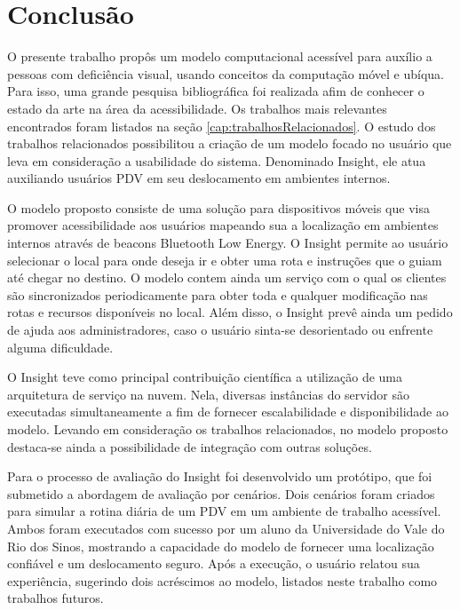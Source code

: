 \documentclass[twoside,english,brazilian]{UNISINOSartigo}
\begin{document}
\section{Conclusão}
O presente trabalho propôs um modelo computacional acessível para auxílio a pessoas com deficiência visual, usando conceitos da computação móvel e ubíqua. Para isso, uma grande pesquisa bibliográfica foi realizada afim de conhecer o estado da arte na área da acessibilidade. Os trabalhos mais relevantes encontrados foram listados na seção \ref{cap:trabalhosRelacionados}. O estudo dos trabalhos relacionados possibilitou a criação de um modelo focado no usuário que leva em consideração a usabilidade do sistema. Denominado Insight, ele atua auxiliando usuários PDV em seu deslocamento em ambientes internos. 

O modelo proposto consiste de uma solução para dispositivos móveis que visa promover acessibilidade aos usuários mapeando sua a localização em ambientes internos através de beacons Bluetooth Low Energy. O Insight permite ao usuário selecionar o local para onde deseja ir e obter uma rota e instruções que o guiam até chegar no destino. O modelo contem ainda um serviço com o qual os clientes são sincronizados periodicamente para obter toda e qualquer modificação nas rotas e recursos disponíveis no local. Além disso, o Insight prevê ainda um pedido de ajuda aos administradores, caso o usuário sinta-se desorientado ou enfrente alguma dificuldade.

O Insight teve como principal contribuição científica a utilização de uma arquitetura de serviço na nuvem. Nela, diversas instâncias do servidor são executadas simultaneamente a fim de fornecer escalabilidade e disponibilidade ao modelo. Levando em consideração os trabalhos relacionados, no modelo proposto destaca-se ainda a possibilidade de integração com outras soluções.

Para o processo de avaliação do Insight foi desenvolvido um protótipo, que foi submetido a abordagem de avaliação por cenários. Dois cenários foram criados para simular a rotina diária de um PDV em um ambiente de trabalho acessível. Ambos foram executados com sucesso por um aluno da Universidade do Vale do Rio dos Sinos, mostrando a capacidade do modelo de fornecer uma localização confiável e um deslocamento seguro. Após a execução, o usuário relatou sua experiência, sugerindo dois acréscimos ao modelo, listados neste trabalho como trabalhos futuros.
\end{document}
